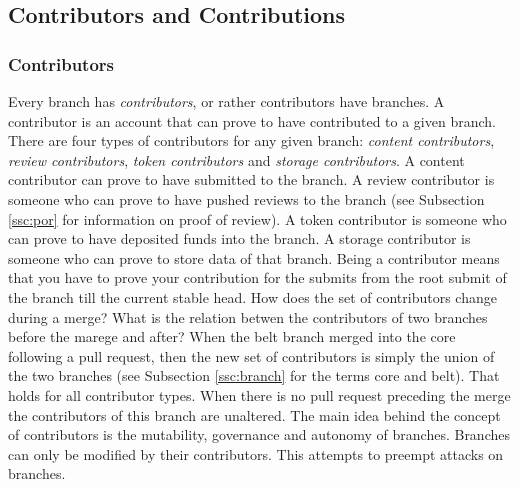\documentclass[14pt]{article}
\begin{document}
\subsection{Contributors and Contributions}
\subsubsection{Contributors}
\label{ssc:contributors}

Every branch has \textit{contributors}, or rather contributors have branches. A contributor is an account that can prove to have contributed to a given branch. There are four types of contributors for any given branch: \textit{content contributors}, \textit{review contributors}, \textit{token contributors} and \textit{storage contributors}. A content contributor can prove to have submitted to the branch. A review contributor is someone who can prove to have pushed reviews to the branch (see Subsection \ref{ssc:por} for information on proof of review). A token contributor is someone who can prove to have deposited funds into the branch. A storage contributor is someone who can prove to store data of that branch. Being a contributor means that you have to prove your contribution for the submits from the root submit of the branch till the current stable head.
How does the set of contributors change during a merge? What is the relation betwen the contributors of two branches before the marege and after? When the belt branch merged into the core following a pull request, then the new set of contributors is simply the union of the two branches (see Subsection \ref{ssc:branch} for the terms core and belt). That holds for all contributor types. When there is no pull request preceding the merge the contributors of this branch are unaltered.
The main idea behind the concept of contributors is the mutability, governance and autonomy of branches. Branches can only be modified by their contributors. This attempts to preempt attacks on branches.

% 

% 
% 
% 
% 
% 
\end{document}
